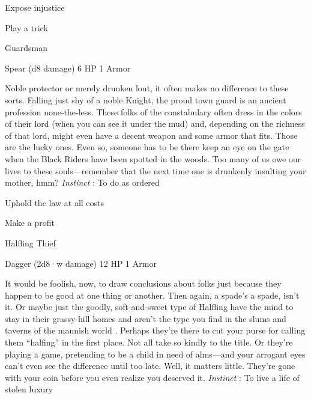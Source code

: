 \startitemize[1,packed]

\item Expose injustice

 
\item Play a trick


\stopitemize
 
\startMonsterName
Guardsman	 
\stopMonsterName
 

Spear (d8 damage)	6 HP	1 Armor

 


 
\startMonsterDescription
Noble protector or merely drunken lout, it often makes no difference to these sorts. Falling just shy of a noble Knight, the proud town guard is an ancient profession none-the-less. These folks of the constabulary often dress in the colors of their lord (when you can see it under the mud) and, depending on the richness of that lord, might even have a decent weapon and some armor that fits. Those are the lucky ones. Even so, someone has to be there keep an eye on the gate when the Black Riders have been spotted in the woods. Too many of us owe our lives to these souls—remember that the next time one is drunkenly insulting your mother, hmm? {\em Instinct} : To do as ordered
\stopMonsterDescription
 
\startitemize[1,packed]

\item Uphold the law at all costs

 
\item Make a profit


\stopitemize
 
\startMonsterName
Halfling Thief	 
\stopMonsterName
 

Dagger (2d8·w damage)	12 HP	1 Armor

 


 
\startMonsterDescription
It would be foolish, now, to draw conclusions about folks just because they happen to be good at one thing or another. Then again, a spade’s a spade, isn’t it. Or maybe just the goodly, soft-and-sweet type of Halfling have the mind to stay in their grassy-hill homes and aren’t the type you find in the slums and taverns of the mannish world . Perhaps they’re there to cut your purse for calling them “halfing” in the first place. Not all take so kindly to the title. Or they’re playing a game, pretending to be a child in need of alms—and your arrogant eyes can’t even see the difference until too late. Well, it matters little. They’re gone with your coin before you even realize you deserved it. {\em Instinct} : To live a life of stolen luxury
\stopMonsterDescription
 

